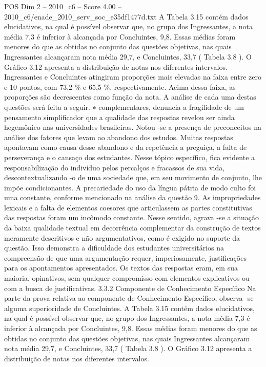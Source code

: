 \begin{textsample}{POS Dim 2 – 2010\_c6 – Score 4.00 – 2010\_c6/enade\_2010\_serv\_soc\_e35df1477d.txt}
A Tabela 3.15 contém dados elucidativos, na qual é possível observar que, no grupo dos Ingressantes, a nota média 7,3 é inferior à alcançada por Concluintes, 9,8.
Essas médias foram menores do que as obtidas no conjunto das questões objetivas, nas quais Ingressantes alcançaram nota média 29,7, e Concluintes, 33,7 ( Tabela 3.8 ).
O Gráfico 3.12 apresenta a distribuição de notas nos diferentes intervalos.
Ingressantes e Concluintes atingiram proporções mais elevadas na faixa entre zero e 10 pontos, com 73,2 \% e 65,5 \%, respectivamente.
Acima dessa faixa, as proporções são decrescentes como função da nota.
A análise de cada uma destas questões será feita a seguir. ∗ complementares, denuncia a fragilidade de um pensamento simplificador que a qualidade das respostas revelou ser ainda hegemônico nas universidades brasileiras.
Notou -se a presença de preconceitos na análise dos fatores que levam ao abandono dos estudos.
Muitas respostas apontavam como causa desse abandono e da repetência a preguiça, a falta de perseverança e o cansaço dos estudantes.
Nesse tópico específico, fica evidente a responsabilização do indivíduo pelos percalços e fracassos de sua vida, descontextualizando -o de uma sociedade que, em seu movimento de conjunto, lhe impõe condicionantes.
A precariedade do uso da língua pátria de modo culto foi uma constante, conforme mencionado na análise da questão 9.
As impropriedades lexicais e a falta de elementos coesores que articulassem as partes constitutivas das respostas foram um incômodo constante.
Nesse sentido, agrava -se a situação da baixa qualidade textual em decorrência complementar da construção de textos meramente descritivos e não argumentativos, como é exigido no suporte da questão.
Isso demonstra a dificuldade dos estudantes universitários na compreensão de que uma argumentação requer, imperiosamente, justificações para os apontamentos apresentados.
Os textos das respostas eram, em sua maioria, opinativos, sem qualquer compromisso com elementos explicativos ou com a busca de justificativas. 3.3.2 Componente de Conhecimento Específico Na parte da prova relativa ao componente de Conhecimento Específico, observa -se alguma superioridade de Concluintes.
A Tabela 3.15 contém dados elucidativos, na qual é possível observar que, no grupo dos Ingressantes, a nota média 7,3 é inferior à alcançada por Concluintes, 9,8.
Essas médias foram menores do que as obtidas no conjunto das questões objetivas, nas quais Ingressantes alcançaram nota média 29,7, e Concluintes, 33,7 ( Tabela 3.8 ).
O Gráfico 3.12 apresenta a distribuição de notas nos diferentes intervalos.

\end{textsample}
